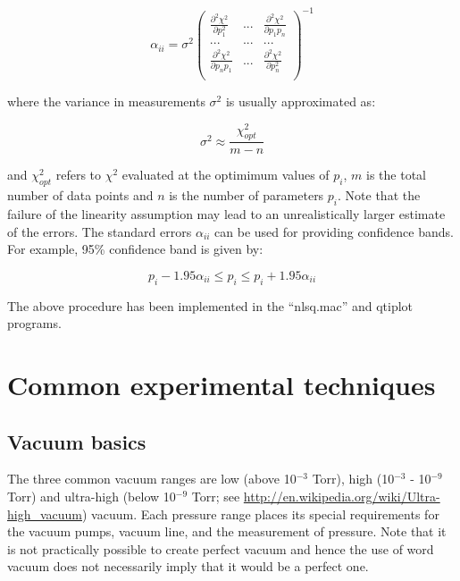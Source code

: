 \documentclass[byrevtex,amssymb,aps,pra,floatfix,letterpaper]{revtex4}
\begin{document}
\begin{equation}
\label{eq22}
\alpha_{ii} = \sigma^2\left(
\begin{array}{ccc}
\frac{\partial^2 \chi^2}{\partial p_1^2} & ... & \frac{\partial^2 \chi^2}{\partial p_1p_n}\\
... & ... & ...\\
\frac{\partial^2 \chi^2}{\partial p_np_1} & ... & \frac{\partial^2 \chi^2}{\partial p_n^2}\\
\end{array}
\right)^{-1}
\end{equation}

\noindent
where the variance in measurements $\sigma^2$ is usually approximated as:

\begin{equation}
\label{eq22a}
\sigma^2 \approx \frac{\chi^2_{opt}}{m-n}
\end{equation}

\noindent
and $\chi^2_{opt}$ refers to $\chi^2$ evaluated at the optimimum values of $p_i$, $m$ is the total number of data points and $n$ is the number of parameters $p_i$. Note that the failure of the linearity assumption may lead to an unrealistically larger estimate of the errors. The standard errors $\alpha_{ii}$ can be used for providing confidence bands. For example, 95\% confidence band is given by:

\begin{equation}
\label{eq22b}
p_i - 1.95\alpha_{ii} \le p_i \le p_i + 1.95\alpha_{ii}
\end{equation}

\noindent
The above procedure has been implemented in the ``nlsq.mac'' and qtiplot programs.

\section{Common experimental techniques}
\label{sec8}

\subsection{Vacuum basics}

The three common vacuum ranges are low (above 10$^{-3}$ Torr), high (10$^{-3}$ - 10$^{-9}$ Torr) and ultra-high (below 10$^{-9}$ Torr; see \url{http://en.wikipedia.org/wiki/Ultra-high_vacuum}) vacuum. Each pressure range places its special requirements for the vacuum pumps, vacuum line, and the measurement of pressure. Note that it is not practically possible to create perfect vacuum and hence the use of word vacuum does not necessarily imply that it would be a perfect one.
\end{document}

